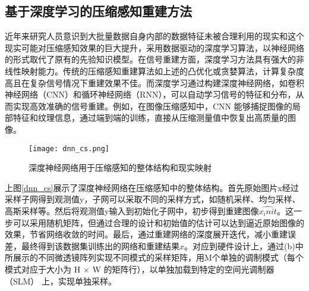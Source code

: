 \subsection{基于深度学习的压缩感知重建方法}
近年来研究人员意识到大批量数据自身内部的数据特征未被合理利用的现实和这个现实可能对压缩感知效果的巨大提升，采用数据驱动的深度学习算法，以神经网络的形式取代了原有的先验知识模型。在信号重建方面，深度学习方法具有强大的非线性映射能力。传统的压缩感知重建算法如上述的凸优化或贪婪算法，计算复杂度高且在复杂信号情况下重建效果不佳。而深度学习通过构建深度神经网络，如卷积神经网络（CNN）和循环神经网络（RNN），可以自动学习信号的特征和分布，从而实现高效准确的信号重建。例如，在图像压缩感知中，CNN 能够捕捉图像的局部特征和纹理信息，通过端到端的训练，直接从压缩测量值中恢复出高质量的图像。

\begin{figure}[ht]
  \centering
  \texttt{[image: dnn\_cs.png]}
  \caption{深度神经网络用于压缩感知的整体结构和现实映射\cite{Practical_compact_deep_compressed_sensing}}
  \label{fig:dnn_cs}
\end{figure}

上图\ref{dnn_cs}展示了深度神经网络在压缩感知中的整体结构。首先原始图片x经过采样子网得到观测值y，子网可以采取不同的采样方式，如随机采样、均匀采样、高斯采样等。然后将观测值y输入到初始化子网中，初步得到重建图像$\hat{x_init}$。这一步可以采用随机矩阵，但通过合理的设计和初始值的估计可以达到逼近原始图像的效果，节省网络收敛的时间。最后，通过重建网络的深度展开迭代，减小重建误差，最终得到该数据集训练出的网络和重建结果$\hat{x}$。对应到硬件设计上，通过(b)中所展示的不同微透镜阵列实现不同模式的采样矩阵，用M个单独的调制模式（每个模式对应于大小为 H × W 的矩阵行），以单独加载到特定的空间光调制器 （SLM） 上，实现单独采样。